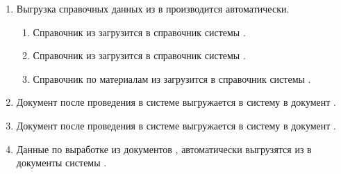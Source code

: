 \begin{enumerate}
\item Выгрузка справочных данных из \gofro в \erp производится автоматически.
\begin{enumerate}
\item 	Справочник   из \gofro загрузится в справочник   системы \unf.
\item	Справочник   из \gofro загрузится в справочник   системы \unf.
\item	Справочник   по материалам из \gofro загрузится в справочник   системы \unf.
\end{enumerate}




\item	Документ  после проведения в системе \gofro выгружается в систему \unf в документ .
\item	Документ  после проведения в системе \gofro выгружается в систему \unf в документ .
\item Данные по выработке из документов ,  автоматически выгрузятся из \gofro в документы  системы \unf.



\end{enumerate}